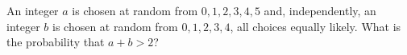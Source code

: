 An integer $a$ is chosen at random from $0,1,2,3,4,5$ and, independently, an integer $b$ is chosen at random from $0,1,2,3,4$, all choices equally likely. What is the probability that $a+b>2$?
